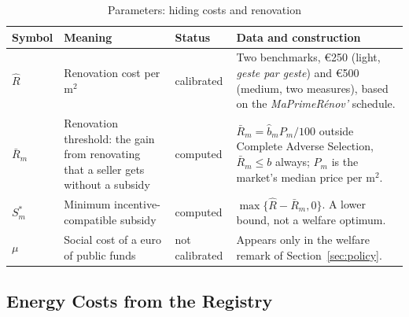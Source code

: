 \begin{table}[htbp]
\centering
\caption{Parameters: hiding costs and renovation}
\label{tab:app_policy}
\footnotesize\renewcommand{\arraystretch}{1.25}
\begin{tabular}{@{}llll@{}}
\toprule\toprule
\textbf{Symbol} & \textbf{Meaning} & \textbf{Status} & \textbf{Data and construction} \\
\midrule
\parbox[t]{.09\textwidth}{\raggedright $\hat R$} & \parbox[t]{.30\textwidth}{\raggedright Renovation cost per m$^2$} & \parbox[t]{.14\textwidth}{\raggedright calibrated} & \parbox[t]{.37\textwidth}{\raggedright Two benchmarks, \euro{}250 (light, \textit{geste par geste}) and \euro{}500 (medium, two measures), based on the \textit{MaPrimeR\'{e}nov'} schedule.} \\[12pt]
\parbox[t]{.09\textwidth}{\raggedright $\bar R_m$} & \parbox[t]{.30\textwidth}{\raggedright Renovation threshold: the gain from renovating that a seller gets without a subsidy} & \parbox[t]{.14\textwidth}{\raggedright computed} & \parbox[t]{.37\textwidth}{\raggedright $\bar R_m=\hat b_m P_m/100$ outside Complete Adverse Selection, $\bar R_m\le b$ always; $P_m$ is the market's median price per m$^2$.} \\[12pt]
\parbox[t]{.09\textwidth}{\raggedright $S^*_m$} & \parbox[t]{.30\textwidth}{\raggedright Minimum incentive-compatible subsidy} & \parbox[t]{.14\textwidth}{\raggedright computed} & \parbox[t]{.37\textwidth}{\raggedright $\max\{\hat R-\bar R_m,0\}$. A lower bound, not a welfare optimum.} \\[12pt]
\parbox[t]{.09\textwidth}{\raggedright $\mu$} & \parbox[t]{.30\textwidth}{\raggedright Social cost of a euro of public funds} & \parbox[t]{.14\textwidth}{\raggedright not calibrated} & \parbox[t]{.37\textwidth}{\raggedright Appears only in the welfare remark of Section~\ref{sec:policy}.} \\[12pt]
\bottomrule
\end{tabular}
\end{table}

\subsection*{Energy Costs from the Registry}
\label{app:energy_costs}

